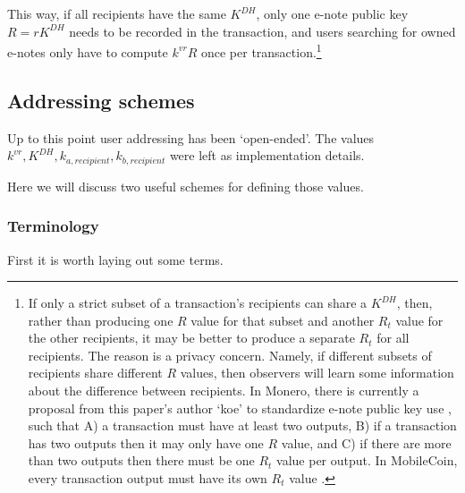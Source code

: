 \begin{itemize}
    This way, if all recipients have the same $K^{DH}$, only one e-note public key $R = r K^{DH}$ needs to be recorded in the transaction, and users searching for owned e-notes only have to compute $k^{vr} R$ once per transaction.\footnote{If only a strict subset of a transaction's recipients can share a $K^{DH}$, then, rather than producing one $R$ value for that subset and another $R_t$ value for the other recipients, it may be better to produce a separate $R_t$ for all recipients. The reason is a privacy concern. Namely, if different subsets of recipients share different $R$ values, then observers will learn some information about the difference between recipients. In Monero, there is currently a proposal from this paper's author `koe' to standardize e-note public key use \cite{update-tx-supplement-proposal-monero}, such that A) a transaction must have at least two outputs, B) if a transaction has two outputs then it may only have one $R$ value, and C) if there are more than two outputs then there must be one $R_t$ value per output. In MobileCoin, every transaction output must have its own $R_t$ value \cite{mom-1}.}
\end{itemize}


\subsection{Addressing schemes}
\label{subsec:implementers-addressing-schemes}

Up to this point user addressing has been `open-ended'. The values $k^{vr}, K^{DH}, k_{a,recipient}, k_{b,recipient}$ were left as implementation details.

Here we will discuss two useful schemes for defining those values.

\subsubsection{Terminology}

First it is worth laying out some terms.

